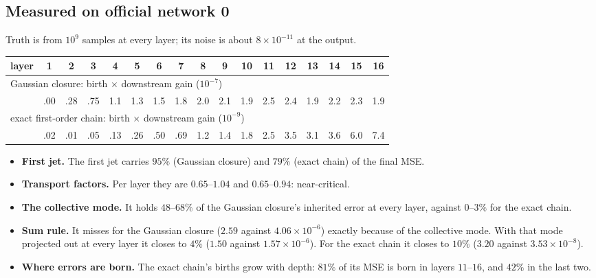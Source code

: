 \subsection{Measured on official network 0}
Truth is from $10^9$ samples at every layer; its noise is about $8\times10^{-11}$ at the output.
\begin{center}\small
\begin{tabular}{lcccccccccccccccc}\toprule
layer & 1&2&3&4&5&6&7&8&9&10&11&12&13&14&15&16\\\midrule
\multicolumn{17}{l}{Gaussian closure: birth $\times$ downstream gain ($10^{-7}$)}\\
& .00&.28&.75&1.1&1.3&1.5&1.8&2.0&2.1&1.9&2.5&2.4&1.9&2.2&2.3&1.9\\
\multicolumn{17}{l}{exact first-order chain: birth $\times$ downstream gain ($10^{-9}$)}\\
& .02&.01&.05&.13&.26&.50&.69&1.2&1.4&1.8&2.5&3.5&3.1&3.6&6.0&7.4\\\bottomrule
\end{tabular}
\end{center}
\begin{itemize}[leftmargin=*]
\item \textbf{First jet.} The first jet carries $95\%$ (Gaussian closure) and $79\%$ (exact chain) of the final MSE.
\item \textbf{Transport factors.} Per layer they are $0.65$--$1.04$ and $0.65$--$0.94$: near-critical.
\item \textbf{The collective mode.} It holds $48$--$68\%$ of the Gaussian closure's inherited error at every layer, against $0$--$3\%$
for the exact chain.
\item \textbf{Sum rule.} It misses for the Gaussian closure ($2.59$ against $4.06\times10^{-6}$) exactly because of the collective
mode. With that mode projected out at every layer it closes to $4\%$ ($1.50$ against $1.57\times10^{-6}$). For the exact chain it
closes to $10\%$ ($3.20$ against $3.53\times10^{-8}$).
\item \textbf{Where errors are born.} The exact chain's births grow with depth: $81\%$ of its MSE is born in layers $11$--$16$, and
$42\%$ in the last two.
\end{itemize}

